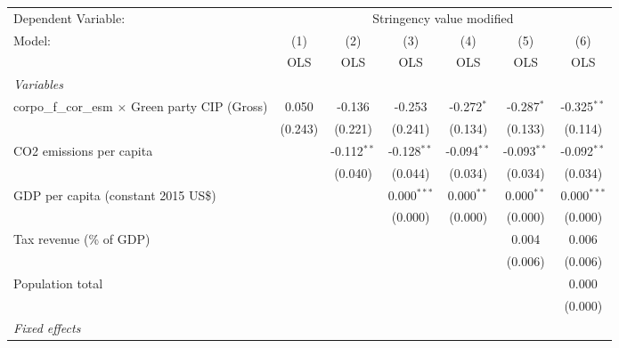 
\begingroup
\centering
\begin{tabular}{lcccccc}
   \toprule
   Dependent Variable: & \multicolumn{6}{c}{Stringency value modified}\\
   Model:                                                  & (1)     & (2)           & (3)           & (4)           & (5)           & (6)\\  
                                                           &  OLS    & OLS           & OLS           & OLS           & OLS           & OLS\\  
   \midrule
   \emph{Variables}\\
   corpo\_f\_cor\_esm $\times$ Green party CIP (Gross)     & 0.050   & -0.136        & -0.253        & -0.272$^{*}$  & -0.287$^{*}$  & -0.325$^{**}$\\   
                                                           & (0.243) & (0.221)       & (0.241)       & (0.134)       & (0.133)       & (0.114)\\   
   CO2 emissions per capita                                &         & -0.112$^{**}$ & -0.128$^{**}$ & -0.094$^{**}$ & -0.093$^{**}$ & -0.092$^{**}$\\   
                                                           &         & (0.040)       & (0.044)       & (0.034)       & (0.034)       & (0.034)\\   
   GDP per capita (constant 2015 US\$)                     &         &               & 0.000$^{***}$ & 0.000$^{**}$  & 0.000$^{**}$  & 0.000$^{***}$\\   
                                                           &         &               & (0.000)       & (0.000)       & (0.000)       & (0.000)\\   
   Tax revenue (\% of GDP)                                 &         &               &               &               & 0.004         & 0.006\\   
                                                           &         &               &               &               & (0.006)       & (0.006)\\   
   Population total                                        &         &               &               &               &               & 0.000\\   
                                                           &         &               &               &               &               & (0.000)\\   
   \emph{Fixed effects}\\

\end{tabular}
